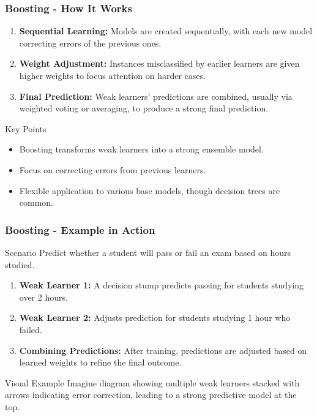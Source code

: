 \documentclass[aspectratio=169]{beamer}
\begin{document}
\begin{frame}[fragile]
    \frametitle{Boosting - How It Works}
    
    \begin{enumerate}
        \item \textbf{Sequential Learning:} Models are created sequentially, with each new model correcting errors of the previous ones.
        \item \textbf{Weight Adjustment:} Instances misclassified by earlier learners are given higher weights to focus attention on harder cases.
        \item \textbf{Final Prediction:} Weak learners' predictions are combined, usually via weighted voting or averaging, to produce a strong final prediction.
    \end{enumerate}
    
    \begin{block}{Key Points}
        \begin{itemize}
            \item Boosting transforms weak learners into a strong ensemble model.
            \item Focus on correcting errors from previous learners.
            \item Flexible application to various base models, though decision trees are common.
        \end{itemize}
    \end{block}
\end{frame}

\begin{frame}[fragile]
    \frametitle{Boosting - Example in Action}

    \begin{block}{Scenario}
        Predict whether a student will pass or fail an exam based on hours studied.
    \end{block}
    
    \begin{enumerate}
        \item \textbf{Weak Learner 1:} A decision stump predicts passing for students studying over 2 hours.
        \item \textbf{Weak Learner 2:} Adjusts prediction for students studying 1 hour who failed.
        \item \textbf{Combining Predictions:} After training, predictions are adjusted based on learned weights to refine the final outcome.
    \end{enumerate}
    
    \begin{block}{Visual Example}
        Imagine diagram showing multiple weak learners stacked with arrows indicating error correction, leading to a strong predictive model at the top.
    \end{block}
\end{frame}
\end{document}
